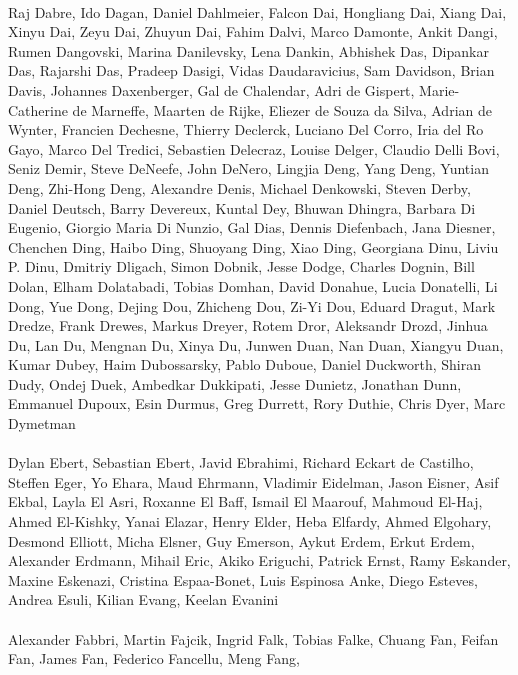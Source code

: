 \documentclass[11pt]{article}
\begin{document}
\begin{description}[itemsep=4mm, style=nextline]
\\
Raj Dabre, 
Ido Dagan, 
Daniel Dahlmeier, 
Falcon Dai, 
Hongliang Dai, 
Xiang Dai, 
Xinyu Dai, 
Zeyu Dai, 
Zhuyun Dai, 
Fahim Dalvi, 
Marco Damonte, 
Ankit Dangi, 
Rumen Dangovski, 
Marina Danilevsky, 
Lena Dankin, 
Abhishek Das, 
Dipankar Das, 
Rajarshi Das, 
Pradeep Dasigi, 
Vidas Daudaravicius, 
Sam Davidson, 
Brian Davis, 
Johannes Daxenberger, 
Gal de Chalendar, 
Adri de Gispert, 
Marie-Catherine de Marneffe, 
Maarten de Rijke, 
Eliezer de Souza da Silva, 
Adrian de Wynter, 
Francien Dechesne, 
Thierry Declerck, 
Luciano Del Corro, 
Iria del Ro Gayo, 
Marco Del Tredici, 
Sebastien Delecraz, 
Louise Delger, 
Claudio Delli Bovi, 
Seniz Demir, 
Steve DeNeefe, 
John DeNero, 
Lingjia Deng, 
Yang Deng, 
Yuntian Deng, 
Zhi-Hong Deng, 
Alexandre Denis, 
Michael Denkowski, 
Steven Derby, 
Daniel Deutsch, 
Barry Devereux, 
Kuntal Dey, 
Bhuwan Dhingra, 
Barbara Di Eugenio, 
Giorgio Maria Di Nunzio, 
Gal Dias, 
Dennis Diefenbach, 
Jana Diesner, 
Chenchen Ding, 
Haibo Ding, 
Shuoyang Ding, 
Xiao Ding, 
Georgiana Dinu, 
Liviu P. Dinu, 
Dmitriy Dligach, 
Simon Dobnik, 
Jesse Dodge, 
Charles Dognin, 
Bill Dolan, 
Elham Dolatabadi, 
Tobias Domhan, 
David Donahue, 
Lucia Donatelli, 
Li Dong, 
Yue Dong, 
Dejing Dou, 
Zhicheng Dou, 
Zi-Yi Dou, 
Eduard Dragut, 
Mark Dredze, 
Frank Drewes, 
Markus Dreyer, 
Rotem Dror, 
Aleksandr Drozd, 
Jinhua Du, 
Lan Du, 
Mengnan Du, 
Xinya Du, 
Junwen Duan, 
Nan Duan, 
Xiangyu Duan, 
Kumar Dubey, 
Haim Dubossarsky, 
Pablo Duboue, 
Daniel Duckworth, 
Shiran Dudy, 
Ondej Duek, 
Ambedkar Dukkipati, 
Jesse Dunietz, 
Jonathan Dunn, 
Emmanuel Dupoux, 
Esin Durmus, 
Greg Durrett, 
Rory Duthie, 
Chris Dyer, 
Marc Dymetman
\\
\\
Dylan Ebert, 
Sebastian Ebert, 
Javid Ebrahimi, 
Richard Eckart de Castilho, 
Steffen Eger, 
Yo Ehara, 
Maud Ehrmann, 
Vladimir Eidelman, 
Jason Eisner, 
Asif Ekbal, 
Layla El Asri, 
Roxanne El Baff, 
Ismail El Maarouf, 
Mahmoud El-Haj, 
Ahmed El-Kishky, 
Yanai Elazar, 
Henry Elder, 
Heba Elfardy, 
Ahmed Elgohary, 
Desmond Elliott, 
Micha Elsner, 
Guy Emerson, 
Aykut Erdem, 
Erkut Erdem, 
Alexander Erdmann, 
Mihail Eric, 
Akiko Eriguchi, 
Patrick Ernst, 
Ramy Eskander, 
Maxine Eskenazi, 
Cristina Espaa-Bonet, 
Luis Espinosa Anke, 
Diego Esteves, 
Andrea Esuli, 
Kilian Evang, 
Keelan Evanini
\\
\\
Alexander Fabbri, 
Martin Fajcik, 
Ingrid Falk, 
Tobias Falke, 
Chuang Fan, 
Feifan Fan, 
James Fan, 
Federico Fancellu, 
Meng Fang, 

\end{description}
\end{document}
